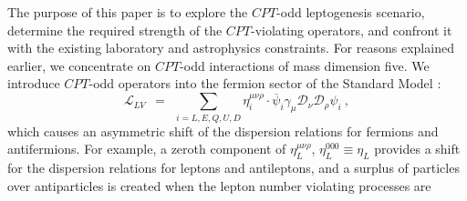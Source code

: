 \documentclass[12pt]{revtex4}
\newcommand{\md}{\mathcal{D}}
\newcommand{\ov}{\overline}
\begin{document}
    
    The purpose of this paper is to explore the $CPT$-odd leptogenesis scenario, 
    determine the required strength of the $CPT$-violating operators, and confront it with the 
    existing laboratory and astrophysics constraints. 
 For reasons explained earlier, we  concentrate on $CPT$-odd interactions of mass dimension five. 
%	
	We introduce $CPT$-odd operators into the fermion sector of the Standard Model
\cite{MP:}:
\begin{equation}
\label{LV}
	\mathcal{L}_{LV} ~~=~~ \sum_{i=L,E,Q,U,D}\eta_i^{\mu\nu\rho}\cdot \ov{\psi}_i\gamma_\mu \md_\nu \md_\rho \psi_i~,
\end{equation}
	which causes an asymmetric shift of the dispersion relations for fermions and antifermions.
	For example, a zeroth component of $ \eta_L^{\mu\nu\rho} $, $ \eta_L^{000} \equiv \eta_L $ provides a 
	shift for the dispersion relations for leptons and antileptons, 
    and a surplus of particles over antiparticles is created when the lepton number violating processes  are
\end{document}
